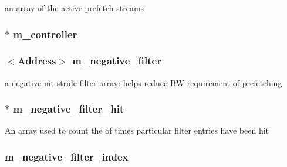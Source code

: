 an array of the active prefetch streams \hypertarget{classPrefetcher_a1e7049f2cd244dc3944af370eb3e979a}{
\subsubsection[{m\_\-controller}]{$\ast$ {\bf m\_\-controller}}}
\label{classPrefetcher_a1e7049f2cd244dc3944af370eb3e979a}
\hypertarget{classPrefetcher_a596c08c70ae40df3eb032cbdf16db62f}{
\subsubsection[{m\_\-negative\_\-filter}]{$<${\bf Address}$>$ {\bf m\_\-negative\_\-filter}}}
\label{classPrefetcher_a596c08c70ae40df3eb032cbdf16db62f}
a negative nit stride filter array: helps reduce BW requirement of prefetching \hypertarget{classPrefetcher_a634a8a03b20af61b964bf187317ff430}{
\subsubsection[{m\_\-negative\_\-filter\_\-hit}]{$\ast$ {\bf m\_\-negative\_\-filter\_\-hit}}}
\label{classPrefetcher_a634a8a03b20af61b964bf187317ff430}
An array used to count the of times particular filter entries have been hit \hypertarget{classPrefetcher_a515ce9fec5ecb09164d1915f41bdd881}{
\subsubsection[{m\_\-negative\_\-filter\_\-index}]{ {\bf m\_\-negative\_\-filter\_\-index}}}
\label{classPrefetcher_a515ce9fec5ecb09164d1915f41bdd881}


